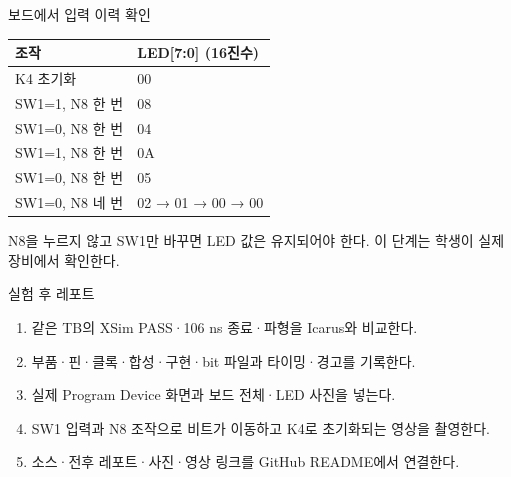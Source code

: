 \begin{frame}{보드에서 입력 이력 확인}
\small
\begin{center}\renewcommand{\arraystretch}{1.55}\begin{tabular}{ll}
조작 & LED[7:0] (16진수)\\\hline
K4 초기화 & 00\\
SW1=1, N8 한 번 & 08\\
SW1=0, N8 한 번 & 04\\
SW1=1, N8 한 번 & 0A\\
SW1=0, N8 한 번 & 05\\
SW1=0, N8 네 번 & 02 → 01 → 00 → 00\\
\end{tabular}\end{center}N8을 누르지 않고 SW1만 바꾸면 LED 값은 유지되어야 한다. 이 단계는 학생이 실제 장비에서 확인한다.\par
\end{frame}

\begin{frame}[label=after-report]{실험 후 레포트}
\small
\begin{enumerate}
\item 같은 TB의 XSim PASS·106 ns 종료·파형을 Icarus와 비교한다.
\item 부품·핀·클록·합성·구현·bit 파일과 타이밍·경고를 기록한다.
\item 실제 Program Device 화면과 보드 전체·LED 사진을 넣는다.
\item SW1 입력과 N8 조작으로 비트가 이동하고 K4로 초기화되는 영상을 촬영한다.
\item 소스·전후 레포트·사진·영상 링크를 GitHub README에서 연결한다.
\end{enumerate}
\end{frame}

